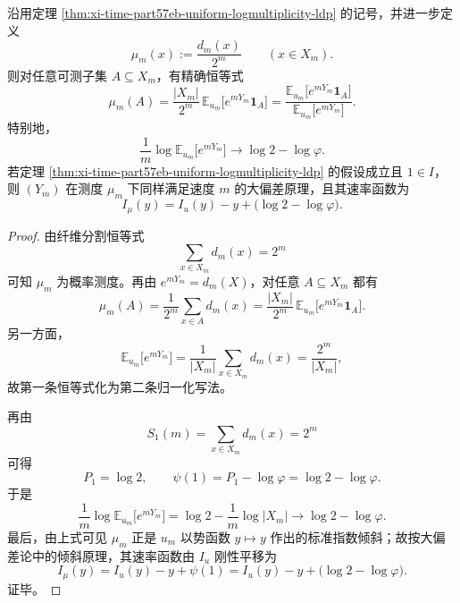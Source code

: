 \begin{theorem}[\texorpdfstring{$q=1$}{q=1} 指数倾斜把均匀层速率函数作刚性线性平移]\label{thm:xi-time-part57eb-sizebias-tilt-rate-shift}
沿用定理 \ref{thm:xi-time-part57eb-uniform-logmultiplicity-ldp} 的记号，并进一步定义
\[
\mu_m(x):=\frac{d_m(x)}{2^m}
\qquad (x\in X_m).
\]
则对任意可测子集 \(A\subseteq X_m\)，有精确恒等式
\[
\mu_m(A)
=
\frac{|X_m|}{2^m}\,
\mathbb E_{u_m}\!\bigl[e^{mY_m}\mathbf 1_A\bigr]
=
\frac{\mathbb E_{u_m}\!\bigl[e^{mY_m}\mathbf 1_A\bigr]}
{\mathbb E_{u_m}\!\bigl[e^{mY_m}\bigr]}.
\]
特别地，
\[
\frac1m\log \mathbb E_{u_m}\!\bigl[e^{mY_m}\bigr]
\longrightarrow
\log 2-\log\varphi.
\]
若定理 \ref{thm:xi-time-part57eb-uniform-logmultiplicity-ldp} 的假设成立且 \(1\in I\)，则 \((Y_m)\) 在测度 \(\mu_m\) 下同样满足速度 \(m\) 的大偏差原理，且其速率函数为
\[
I_\mu(y)=I_u(y)-y+\bigl(\log 2-\log\varphi\bigr).
\]
\end{theorem}
\begin{proof}
由纤维分割恒等式
\[
\sum_{x\in X_m}d_m(x)=2^m
\]
可知 \(\mu_m\) 为概率测度。再由 \(e^{mY_m}=d_m(X)\)，对任意 \(A\subseteq X_m\) 都有
\[
\mu_m(A)
=
\frac1{2^m}\sum_{x\in A}d_m(x)
=
\frac{|X_m|}{2^m}\,
\mathbb E_{u_m}\!\bigl[e^{mY_m}\mathbf 1_A\bigr].
\]
另一方面，
\[
\mathbb E_{u_m}\!\bigl[e^{mY_m}\bigr]
=
\frac1{|X_m|}\sum_{x\in X_m}d_m(x)
=
\frac{2^m}{|X_m|},
\]
故第一条恒等式化为第二条归一化写法。

再由
\[
S_1(m)=\sum_{x\in X_m}d_m(x)=2^m
\]
可得
\[
P_1=\log 2,
\qquad
\psi(1)=P_1-\log\varphi=\log 2-\log\varphi.
\]
于是
\[
\frac1m\log \mathbb E_{u_m}\!\bigl[e^{mY_m}\bigr]
=
\log 2-\frac1m\log|X_m|
\longrightarrow
\log 2-\log\varphi.
\]
最后，由上式可见 \(\mu_m\) 正是 \(u_m\) 以势函数 \(y\mapsto y\) 作出的标准指数倾斜；故按大偏差论中的倾斜原理，其速率函数由 \(I_u\) 刚性平移为
\[
I_\mu(y)=I_u(y)-y+\psi(1)
=
I_u(y)-y+\bigl(\log 2-\log\varphi\bigr).
\]
证毕。
\end{proof}

